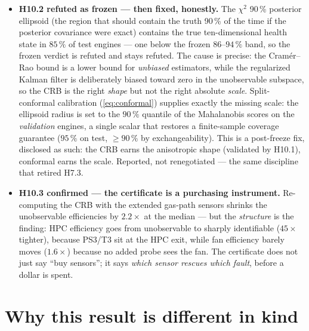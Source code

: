\begin{itemize}
    So the two together decompose the original: of $\rho = 0.70$, about $0.24$ was the shared
    matrix and about $0.46$ is signal that survives without it. \textbf{The certificate is not
    shown to be dishonest --- it is shown to be unprovable by the test F10 chose}, because a
    rank correlation over ten directions cannot reach significance at that effect size. The
    claim that this is the first \emph{ground-truth-validated} identifiability guarantee for
    gas-path diagnosis should therefore be read as first \emph{ground-truth-tested}.
  \item \textbf{H10.2 refuted as frozen --- then fixed, honestly.} The $\chi^2$ 90\,\%
    posterior ellipsoid (the region that should contain the truth 90\,\% of the time if the
    posterior covariance were exact) contains the true ten-dimensional health state in $85\,\%$ of test
    engines --- one below the frozen $86$--$94\,\%$ band, so the frozen verdict is refuted and
    stays refuted. The cause is precise: the Cram\'er--Rao bound is a lower bound for
    \emph{unbiased} estimators, while the regularized Kalman filter is deliberately biased
    toward zero in the unobservable subspace, so the CRB is the right \emph{shape} but not
    the right absolute \emph{scale}. Split-conformal calibration (\cref{eq:conformal}) supplies
    exactly the missing scale: the ellipsoid radius is set to the $90\,\%$ quantile of the
    Mahalanobis scores on the \emph{validation} engines, a single scalar that restores a
    finite-sample coverage guarantee ($95\,\%$ on test, $\geq 90\,\%$ by exchangeability).
    This is a post-freeze fix, disclosed as such: the CRB earns the anisotropic shape
    (validated by H10.1), conformal earns the scale. Reported, not renegotiated --- the same
    discipline that retired H7.3.
  \item \textbf{H10.3 confirmed --- the certificate is a purchasing instrument.} Re-computing
    the CRB with the extended gas-path sensors shrinks the unobservable efficiencies by
    $2.2\times$ at the median --- but the \emph{structure} is the finding: HPC efficiency
    goes from unobservable to sharply identifiable ($45\times$ tighter), because PS3/T3 sit
    at the HPC exit, while fan efficiency barely moves ($1.6\times$) because no added probe
    sees the fan. The certificate does not just say ``buy sensors''; it says \emph{which
    sensor rescues which fault}, before a dollar is spent.
\end{itemize}

\section{Why this result is different in kind}
\label{sec:bt-why}

